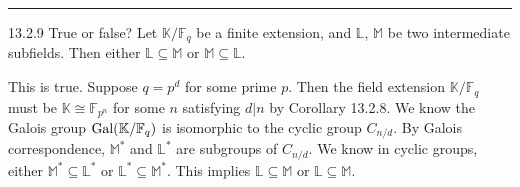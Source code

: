 \documentclass[a4paper, 12pt]{article}
\begin{document}
\noindent\rule{7in}{2.8pt}
\begin{problem}{13.2.9}
True or false? Let \(\mathbb{K}/\mathbb{F}_q\) be a finite extension, and \(\mathbb{L}\), \(\mathbb{M}\) be two intermediate subfields. Then either \(\mathbb{L}\subseteq \mathbb{M}\) or \(\mathbb{M}\subseteq \mathbb{L}\). 
\end{problem}
\begin{solution}
This is true. Suppose \(q=p^d\) for some prime \(p\). Then the field extension \(\mathbb{K}/\mathbb{F}_q\) must be \(\mathbb{K}\cong \mathbb{F}_{p^n}\) for some \(n\) satisfying \(d|n\) by Corollary 13.2.8. We know the Galois group 
\(\text{Gal}(\mathbb{K}/\mathbb{F}_q)\) is isomorphic to the cyclic group \(C_{n/d}\). By Galois correspondence, \(\mathbb{M}^*\) and \(\mathbb{L}^*\) are subgroups of \(C_{n/d}\). We know in cyclic groups, either \(\mathbb{M}^*\subseteq \mathbb{L}^*\) or \(\mathbb{L}^*\subseteq \mathbb{M}^*\). 
This implies \(\mathbb{L}\subseteq \mathbb{M}\) or \(\mathbb{L}\subseteq \mathbb{M}\).
\end{solution}
\end{document}

